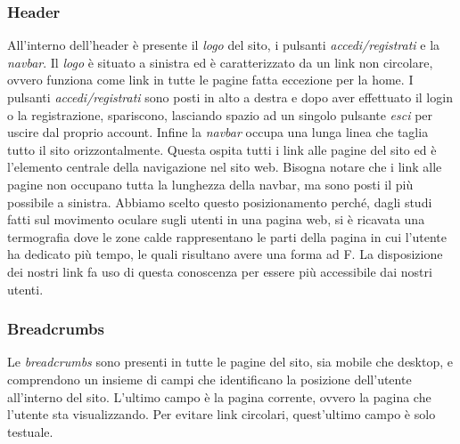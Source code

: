 \subsubsection{Header}
All’interno dell’header è presente il \textit{logo} del sito, i pulsanti \textit{accedi/registrati} e la \textit{navbar}.
Il \textit{logo} è situato a sinistra ed è caratterizzato da un link non circolare, ovvero funziona come link in tutte le pagine fatta eccezione per la home.
I pulsanti \textit{accedi/registrati} sono posti in alto a destra e dopo aver effettuato il login o la registrazione, spariscono, lasciando spazio ad un singolo pulsante \textit{esci} per uscire dal proprio account.
Infine la \textit{navbar} occupa una lunga linea che taglia tutto il sito orizzontalmente.
Questa ospita tutti i link alle pagine del sito ed è l’elemento centrale della navigazione nel sito web.
Bisogna notare che i link alle pagine non occupano tutta la lunghezza della navbar, ma sono posti il più possibile a sinistra.
Abbiamo scelto questo posizionamento perché, dagli studi fatti sul movimento oculare sugli utenti in una pagina web, si è ricavata una termograﬁa dove le zone calde rappresentano le parti della pagina in cui l’utente ha dedicato più tempo, le quali risultano avere una forma ad F.
La disposizione dei nostri link fa uso di questa conoscenza per essere più accessibile dai nostri utenti.

\subsubsection{Breadcrumbs}
Le \textit{breadcrumbs} sono presenti in tutte le pagine del sito, sia mobile che desktop, e comprendono un insieme di campi che identiﬁcano la posizione dell’utente all’interno del sito. L’ultimo campo è la pagina corrente, ovvero la pagina che l’utente sta visualizzando. Per evitare link circolari, quest’ultimo campo è solo testuale.

